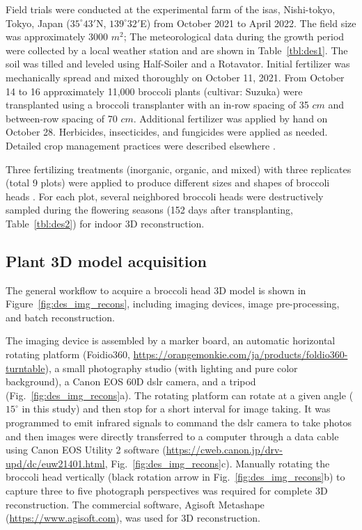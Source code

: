 Field trials were conducted at the experimental farm of the \gls{isas}, Nishi-tokyo, Tokyo, Japan ($35^\circ 43'$N, $139^\circ 32'$E) from October 2021 to April 2022. The field size was approximately 3000 $m^2$; The meteorological data during the growth period were collected by a local weather station and are shown in Table~\ref{tbl:des1}. The soil was tilled and leveled using Half-Soiler and a Rotavator. Initial fertilizer was mechanically spread and mixed thoroughly on October 11, 2021. From October 14 to 16 approximately 11,000 broccoli plants (cultivar: Suzuka) were transplanted using a broccoli transplanter with an in-row spacing of 35 $cm$ and between-row spacing of 70 $cm$. Additional fertilizer was applied by hand on October 28. Herbicides, insecticides, and fungicides were applied as needed. Detailed crop management practices were described elsewhere \citep{nishida_estimation_2023}.



Three fertilizing treatments (inorganic, organic, and mixed) with three replicates (total 9 plots) were applied to produce different sizes and shapes of broccoli heads \citep{nishida_estimation_2023}. For each plot, several neighbored broccoli heads were destructively sampled during the flowering seasons (152 days after transplanting, Table~\ref{tbl:des2}) for indoor 3D reconstruction. 



\subsection{Plant 3D model acquisition}

The general workflow to acquire a broccoli head 3D model is shown in Figure~\ref{fig:des_img_recons}, including imaging devices, image pre-processing, and batch reconstruction.



The imaging device is assembled by a marker board, an automatic horizontal rotating platform (Foidio360, \url{https://orangemonkie.com/ja/products/foldio360-turntable}), a small photography studio (with lighting and pure color background), a Canon EOS 60D \gls{dslr} camera, and a tripod (Fig.~\ref{fig:des_img_recons}a). The rotating platform can rotate at a given angle ($15^\circ$ in this study) and then stop for a short interval for image taking. It was programmed to emit infrared signals to command the \gls{dslr} camera to take photos and then images were directly transferred to a computer through a data cable using Canon EOS Utility 2 software (\url{https://cweb.canon.jp/drv-upd/dc/euw21401.html}, Fig.~\ref{fig:des_img_recons}c). Manually rotating the broccoli head vertically (black rotation arrow in Fig.~\ref{fig:des_img_recons}b) to capture three to five photograph perspectives was required for complete 3D reconstruction. The commercial software, Agisoft Metashape (\url{https://www.agisoft.com}), was used for 3D reconstruction.

